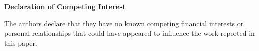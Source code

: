 \documentclass[11pt]{article}
\begin{document}
\begin{center}
    \Large\textbf{Declaration of Competing Interest}
\end{center}
\vspace{1em}

The authors declare that they have no known competing financial interests or personal relationships that could have appeared to influence the work reported in this paper.
\end{document}
